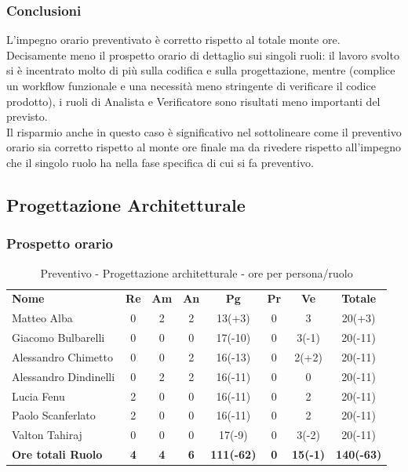 \subsubsection{Conclusioni}
L'impegno orario preventivato è corretto rispetto al totale monte ore.\\ Decisamente meno il prospetto orario di dettaglio sui singoli ruoli: il lavoro svolto si è incentrato molto di più sulla codifica e sulla progettazione, mentre (complice un workflow funzionale e una necessità meno stringente di verificare il codice prodotto), i ruoli di Analista e Verificatore sono risultati meno importanti del previsto.\\
Il risparmio anche in questo caso è significativo nel sottolineare come il preventivo orario sia corretto rispetto al monte ore finale ma da rivedere rispetto all'impegno che il singolo ruolo ha nella fase specifica di cui si fa preventivo. \\ 

\newpage
\subsection{Progettazione Architetturale}
\subsubsection{Prospetto orario}

\begin{table} [h!]
	\begin{center}
		\begin{tabular} { m{3.5cm} c c c c c c c }
			\rowcolor{lightgray}
			\textbf{Nome} & \textbf{Re} & \textbf{Am} & \textbf{An} & \textbf{Pg} & \textbf{Pr} & \textbf{Ve} & \textbf{Totale} \\
			Matteo Alba & 0 & 2 & 2 & 13(+3) & 0 & 3 & 20(+3) \\
			Giacomo Bulbarelli & 0 & 0 & 0 & 17(-10) & 0 & 3(-1) & 20(-11) \\
			Alessandro Chimetto & 0 & 0 & 2 & 16(-13) & 0 & 2(+2) & 20(-11) \\
			Alessandro Dindinelli & 0 & 2 & 2 & 16(-11) & 0 & 0 & 20(-11) \\
			Lucia Fenu & 2 & 0 & 0 & 16(-11) & 0 & 2 & 20(-11) \\
			Paolo Scanferlato & 2 & 0 & 0 & 16(-11) & 0 & 2 & 20(-11) \\
			Valton Tahiraj & 0 & 0 & 0 & 17(-9) & 0 & 3(-2) & 20(-11)\\
			\textbf{Ore totali Ruolo} & \textbf{4} & \textbf{4} & \textbf{6} & \textbf{111(-62)} & \textbf{0}& \textbf{15(-1)} & \textbf{140(-63)}
		\end{tabular}
		\caption{Preventivo - Progettazione architetturale - ore per persona/ruolo}
	\end{center}
\end{table}

